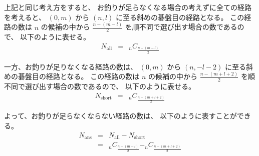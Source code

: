 上記と同じ考え方をすると、
お釣りが足らなくなる場合の考えずに全ての経路を考えると、
$(0,m)$ から $(n,l)$ に至る斜めの碁盤目の経路となる。
この経路の数は
$n$ の候補の中から $\frac{n - (m-l)}{2}$ を順不同で選び出す場合の数であるので、
以下のように表せる。
  \begin{eqnarray}
    N_{\text{all}} & = & _{n}C_{\frac{n - (m-l)}{2}}
  \end{eqnarray}

一方、お釣りが足りなくなる経路の数は、
$(0,m)$ から $(n,-l-2)$ に至る斜めの碁盤目の経路となる。
この経路の数は
$n$ の候補の中から $\frac{n - (m+l+2)}{2}$ を順不同で選び出す場合の数であるので、
以下のように表せる。
  \begin{eqnarray}
    N_{\text{short}} & = & _{n}C_{\frac{n - (m+l+2)}{2}}
  \end{eqnarray}

よって、お釣りが足らなくならない経路の数は、
以下のように表すことができる。
  \begin{eqnarray}
    N_{\text{ans}} & = & N_{\text{all}} - N_{\text{short}}
  \\
      & = & _{n}C_{\frac{n - (m-l)}{2}} - _{n}C_{\frac{n - (m+l+2)}{2}}
  \end{eqnarray}
